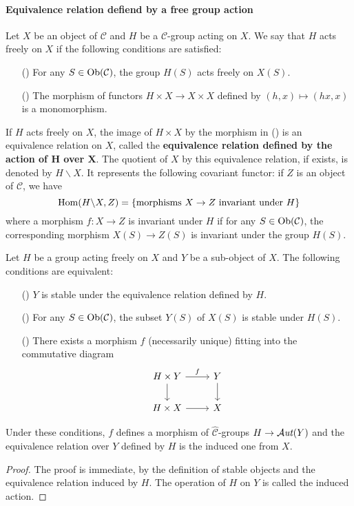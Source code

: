 \paragraph{Equivalence relation defiend by a free group action}
\begin{definition}
Let $X$ be an object of $\mathcal{C}$ and $H$ be a $\mathcal{C}$-group acting on $X$. We say that $H$ acts freely on $X$ if the following conditions are satisfied:
\begin{enumerate}
    \item[(\rmnum{1})] For any $S\in\mathrm{Ob}(\mathcal{C})$, the group $H(S)$ acts freely on $X(S)$.
    \item[(\rmnum{2})] The morphism of functors $H\times X\to X\times X$ defined by $(h,x)\mapsto(hx,x)$ is a monomorphism. 
\end{enumerate}
\end{definition}
If $H$ acts freely on $X$, the image of $H\times X$ by the morphism in () is an equivalence relation on $X$, called the \textbf{equivalence relation defined by the action of $\bm{H}$ over $\bm{X}$}. The quotient of $X$ by this equivalence relation, if exists, is denoted by $H\backslash X$. It represents the following covariant functor: if $Z$ is an object of $\mathcal{C}$, we have
\[\mathrm{Hom}(H\backslash X,Z)=\{\text{morphisms $X\to Z$ invariant under $H$}\}\]
where a morphism $f:X\to Z$ is invariant under $H$ if for any $S\in\mathrm{Ob}(\mathcal{C})$, the corresponding morphism $X(S)\to Z(S)$ is invariant under the group $H(S)$.

\begin{lemma}
Let $H$ be a group acting freely on $X$ and $Y$ be a sub-object of $X$. The following conditions are equivalent:
\begin{enumerate}
    \item[(\rmnum{1})] $Y$ is stable under the equivalence relation defined by $H$.
    \item[(\rmnum{2})] For any $S\in\mathrm{Ob}(\mathcal{C})$, the subset $Y(S)$ of $X(S)$ is stable under $H(S)$.
    \item[(\rmnum{3})] There exists a morphism $f$ (necessarily unique) fitting into the commutative diagram
    \[\begin{tikzcd}
    H\times Y\ar[r,"f"]\ar[d]&Y\ar[d]\\
    H\times X\ar[r]&X
    \end{tikzcd}\]
\end{enumerate}
Under these conditions, $f$ defines a morphism of $\widehat{\mathcal{C}}$-groups $H\to\operatorname{\mathcal{A}\hspace*{-0.2pt}\textit{ut}\hspace{0.5pt}}(Y)$ and the equivalence relation over $Y$ defined by $H$ is the induced one from $X$.
\end{lemma}
\begin{proof}
The proof is immediate, by the definition of stable objects and the equivalence relation induced by $H$. The operation of $H$ on $Y$ is called the induced action.
\end{proof}

